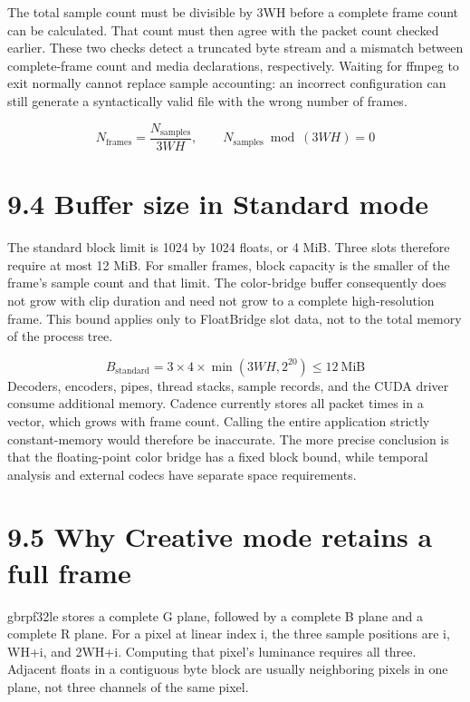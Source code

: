 \documentclass[11pt,a4paper,openany]{book}
\begin{document}
The total sample count must be divisible by 3WH before a complete frame count can be calculated. That count must then agree with the packet count checked earlier. These two checks detect a truncated byte stream and a mismatch between complete-frame count and media declarations, respectively. Waiting for ffmpeg to exit normally cannot replace sample accounting: an incorrect configuration can still generate a syntactically valid file with the wrong number of frames.


\begin{equation}
N_{\mathrm{frames}}=\frac{N_{\mathrm{samples}}}{3WH},\qquad N_{\mathrm{samples}}\bmod(3WH)=0
\end{equation}

\section*{9.4 Buffer size in Standard mode}
The standard block limit is 1024 by 1024 floats, or 4 MiB. Three slots therefore require at most 12 MiB. For smaller frames, block capacity is the smaller of the frame's sample count and that limit. The color-bridge buffer consequently does not grow with clip duration and need not grow to a complete high-resolution frame. This bound applies only to FloatBridge slot data, not to the total memory of the process tree.


\begin{equation}
B_{\mathrm{standard}}=3\times4\times\min(3WH,2^{20})\leq12\ \mathrm{MiB}
\end{equation}
Decoders, encoders, pipes, thread stacks, sample records, and the CUDA driver consume additional memory. Cadence currently stores all packet times in a vector, which grows with frame count. Calling the entire application strictly constant-memory would therefore be inaccurate. The more precise conclusion is that the floating-point color bridge has a fixed block bound, while temporal analysis and external codecs have separate space requirements.


\section*{9.5 Why Creative mode retains a full frame}
gbrpf32le stores a complete G plane, followed by a complete B plane and a complete R plane. For a pixel at linear index i, the three sample positions are i, WH+i, and 2WH+i. Computing that pixel's luminance requires all three. Adjacent floats in a contiguous byte block are usually neighboring pixels in one plane, not three channels of the same pixel.
\end{document}
